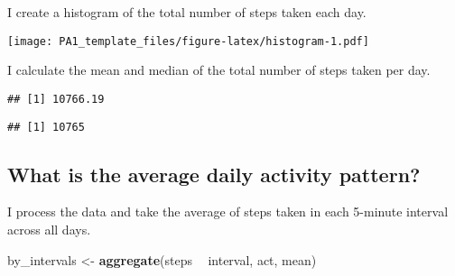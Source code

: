 \documentclass[
]{article}
\newenvironment{Shaded}{\begin{snugshade}}{\end{snugshade}}
\newcommand{\DataTypeTok}[1]{\textcolor[rgb]{0.13,0.29,0.53}{#1}}
\newcommand{\KeywordTok}[1]{\textcolor[rgb]{0.13,0.29,0.53}{\textbf{#1}}}
\newcommand{\NormalTok}[1]{#1}
\newcommand{\OperatorTok}[1]{\textcolor[rgb]{0.81,0.36,0.00}{\textbf{#1}}}
\newcommand{\OtherTok}[1]{\textcolor[rgb]{0.56,0.35,0.01}{#1}}
\newcommand{\StringTok}[1]{\textcolor[rgb]{0.31,0.60,0.02}{#1}}
\begin{document}
I create a histogram of the total number of steps taken each day.

\begin{Shaded}
\end{Shaded}

\texttt{[image: PA1\_template\_files/figure-latex/histogram-1.pdf]}

I calculate the mean and median of the total number of steps taken per
day.

\begin{Shaded}
\end{Shaded}

\begin{verbatim}
## [1] 10766.19
\end{verbatim}

\begin{Shaded}
\end{Shaded}

\begin{verbatim}
## [1] 10765
\end{verbatim}

\hypertarget{what-is-the-average-daily-activity-pattern}{%
\subsection{What is the average daily activity
pattern?}\label{what-is-the-average-daily-activity-pattern}}

I process the data and take the average of steps taken in each 5-minute
interval across all days.

\begin{Shaded}
\begin{Highlighting}[]
\NormalTok{by_intervals <-}\StringTok{ }\KeywordTok{aggregate}\NormalTok{(steps }\OperatorTok{~}\StringTok{ }\NormalTok{interval, act, mean)}
\end{Highlighting}
\end{Shaded}
\end{document}
